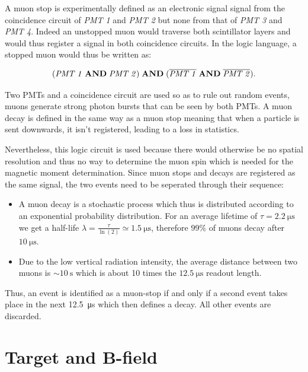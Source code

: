 A muon stop is experimentally defined as an electronic signal signal from the coincidence circuit of \textit{PMT 1} and \textit{PMT 2} but none from that of \textit{PMT 3} and \textit{PMT 4}. Indeed an unstopped muon would traverse both scintillator layers and would thus register a signal in both coincidence circuits. In the logic language, a stopped muon would thus be written as:

\begin{equation}
(\text{\textit{PMT 1}} \;\text{\textbf{AND}} \; \text{\textit{PMT 2}}) \; \text{\textbf{AND}} \; (\overline{\text{\textit{PMT 1}}} \; \text{\textbf{AND}} \; \overline{\text{\textit{PMT 2}}}).
\end{equation}

Two PMTs and a coincidence circuit are used so as to rule out random events, muons generate strong photon bursts that can be seen by both PMTs. A muon decay is defined in the same way as a muon stop meaning that when a particle is sent downwards, it isn't registered, leading to a loss in statistics.

Nevertheless, this logic circuit is used because there would otherwise be no spatial resolution and thus no way to determine the muon spin which is needed for the magnetic moment determination. Since muon stops and decays are registered as the same signal, the two events need to be seperated through their sequence:

\begin{itemize}
\item A muon decay is a stochastic process which thus is distributed according to an exponential probability distribution. For an average lifetime of $\tau=\SI{2.2}{\micro\second}$ we get a half-life $\lambda=\frac{\tau}{\ln(2)}\simeq \SI{1.5}{\micro\second}$, therefore $99\%$ of muons decay after $\SI{10}{\micro\second}$.
\item Due to the low vertical radiation intensity, the average distance between two muons is $\sim\SI{10}{\second}$ which is about 10 times the $\SI{12.5}{\micro\second}$ readout length.
\end{itemize}

Thus, an event is identified as a muon-stop if and only if a second event takes place in the next \SI{12.5}{\micro\second} which then defines a decay. All other events are discarded.


\section{Target and B-field}

